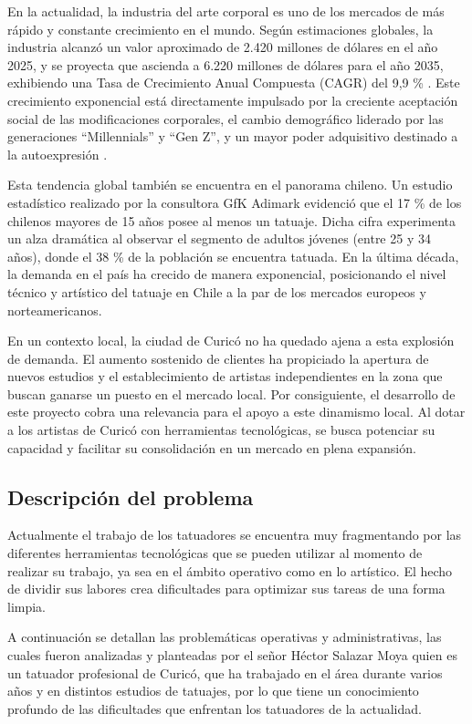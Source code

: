 En la actualidad, la industria del arte corporal es uno de los mercados de más rápido y constante crecimiento en el mundo. Según estimaciones globales, la industria alcanzó un valor aproximado de 2.420 millones de dólares en el año 2025, y se proyecta que ascienda a 6.220 millones de dólares para el año 2035, exhibiendo una Tasa de Crecimiento Anual Compuesta (CAGR) del 9,9 \% \cite{ide2026}. Este crecimiento exponencial está directamente impulsado por la creciente aceptación social de las modificaciones corporales, el cambio demográfico liderado por las generaciones ``Millennials'' y ``Gen Z'', y un mayor poder adquisitivo destinado a la autoexpresión \cite{ide2026}.

Esta tendencia global también se encuentra en el panorama chileno. Un estudio estadístico realizado por la consultora GfK Adimark evidenció que el 17 \% de los chilenos mayores de 15 años posee al menos un tatuaje. Dicha cifra experimenta un alza dramática al observar el segmento de adultos jóvenes (entre 25 y 34 años), donde el 38 \% de la población se encuentra tatuada. En la última década, la demanda en el país ha crecido de manera exponencial, posicionando el nivel técnico y artístico del tatuaje en Chile a la par de los mercados europeos y norteamericanos\cite{sepulveda2017}.

En un contexto local, la ciudad de Curicó no ha quedado ajena a esta explosión de demanda. El aumento sostenido de clientes ha propiciado la apertura de nuevos estudios y el establecimiento de artistas independientes en la zona que buscan ganarse un puesto en el mercado local. Por consiguiente, el desarrollo de este proyecto cobra una relevancia para el apoyo a este dinamismo local. Al dotar a los artistas de Curicó con herramientas tecnológicas, se busca potenciar su capacidad y facilitar su consolidación en un mercado en plena expansión.

\subsection{Descripción del problema}

Actualmente el trabajo de los tatuadores se encuentra muy fragmentando por las diferentes herramientas tecnológicas que se pueden utilizar al momento de realizar su trabajo, ya sea en el ámbito operativo como en lo artístico. El hecho de dividir sus labores crea dificultades para optimizar sus tareas de una forma limpia.

A continuación se detallan las problemáticas operativas y administrativas, las cuales fueron analizadas y planteadas por el señor Héctor Salazar Moya quien es un tatuador profesional de Curicó, que ha trabajado en el área durante varios años y en distintos estudios de tatuajes, por lo que tiene un conocimiento profundo de las dificultades que enfrentan los tatuadores de la actualidad.

